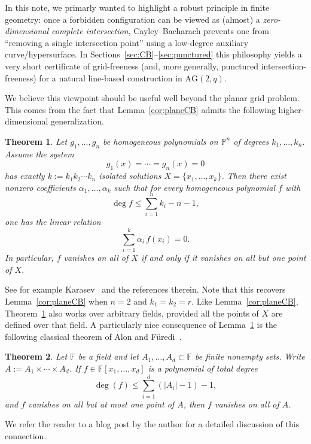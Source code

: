 \documentclass[11pt]{article}
\newtheorem{theorem}{Theorem}[section]
\theoremstyle{definition}
\theoremstyle{remark}
\newcommand{\F}{\mathbb{F}}
\newcommand{\PP}{\mathbb{P}}
\newcommand{\AG}{\mathrm{AG}}
\begin{document}
In this note, we primarly wanted to highlight a robust principle in finite geometry: once a forbidden configuration can be viewed
as (almost) a \emph{zero-dimensional complete intersection}, Cayley--Bacharach prevents one from
``removing a single intersection point'' using a low-degree auxiliary curve/hypersurface.
In Sections~\ref{sec:CB}--\ref{sec:punctured} this philosophy yields a very short certificate of
grid-freeness (and, more generally, punctured intersection-freeness) for a natural line-based
construction in $\AG(2,q)$.

We believe this viewpoint should be useful well beyond the planar grid problem. This comes from the fact that Lemma~\ref{cor:planeCB} admits the following higher-dimensional generalization.

\begin{theorem}\label{thm:KarasevCB}
Let $g_1,\dots,g_n$ be homogeneous polynomials on $\PP^n$ of degrees $k_1,\dots,k_n$.
Assume the system
\[
g_1(x)=\cdots=g_n(x)=0
\]
has exactly $k:=k_1k_2\cdots k_n$ \emph{isolated} solutions $X=\{x_1,\dots,x_k\}$. Then there exist nonzero coefficients $\alpha_1,\dots,\alpha_k$ such that for every homogeneous polynomial $f$
with
\[
\deg f \le \sum_{i=1}^n k_i - n - 1,
\]
one has the linear relation
\[
\sum_{i=1}^k \alpha_i\, f(x_i) = 0.
\]
In particular, $f$ vanishes on all of $X$ if and only if
it vanishes on all but one point of $X$.
\end{theorem}

See for example Karasev~\cite[Theorem 5.1]{Karasev} and the references therein. Note that this recovers Lemma~\ref{cor:planeCB} when $n=2$ and $k_1=k_2=r$. Like Lemma~\ref{cor:planeCB}, Theorem~\ref{thm:KarasevCB} also works over arbitrary fields, provided all the points of $X$ are defined over that field. A particularly nice consequence of Lemma~\ref{thm:KarasevCB} is the following classical theorem of Alon and F\"uredi~\cite{AlonFuredi}.

\begin{theorem}\label{thm:AlonFuredi}
Let $\F$ be a field and let $A_1,\dots,A_d\subset \F$ be finite nonempty sets.
Write $A:=A_1\times\cdots\times A_d$.
If $f\in \F[x_1,\dots,x_d]$ is a polynomial of total degree
\[
\deg(f)\le \sum_{i=1}^d (|A_i|-1)-1,
\]
and $f$ vanishes on all but at most one point of $A$, then $f$ vanishes on all of $A$.
\end{theorem}
We refer the reader to a blog post by the author \cite{PohoataBlog} for a detailed discussion of this connection.
\end{document}
